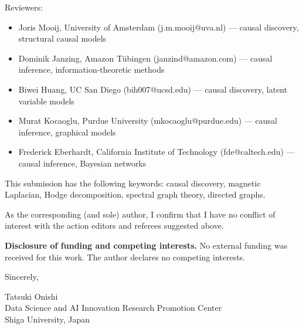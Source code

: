 Reviewers:
\begin{itemize}
  \item Joris Mooij, University of Amsterdam (j.m.mooij@uva.nl) --- causal discovery, structural causal models
  \item Dominik Janzing, Amazon T\"ubingen (janzind@amazon.com) --- causal inference, information-theoretic methods
  \item Biwei Huang, UC San Diego (bih007@ucsd.edu) --- causal discovery, latent variable models
  \item Murat Kocaoglu, Purdue University (mkocaoglu@purdue.edu) --- causal inference, graphical models
  \item Frederick Eberhardt, California Institute of Technology (fde@caltech.edu) --- causal inference, Bayesian networks
\end{itemize}

This submission has the following keywords: causal discovery, magnetic
Laplacian, Hodge decomposition, spectral graph theory, directed graphs.

As the corresponding (and sole) author, I confirm that I have no conflict
of interest with the action editors and referees suggested above.

\medskip

\textbf{Disclosure of funding and competing interests.}
No external funding was received for this work.
The author declares no competing interests.

\bigskip

Sincerely,

\medskip

Tatsuki Onishi\\
Data Science and AI Innovation Research Promotion Center\\
Shiga University, Japan


